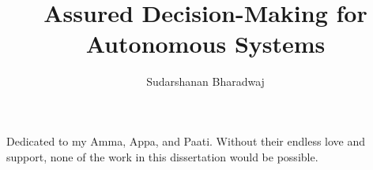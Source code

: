 \documentclass[12pt]{report}	%
\author{Sudarshanan Bharadwaj}  	%
\title{Assured Decision-Making for Autonomous Systems}
\theoremstyle{definition}
\theoremstyle{remark}
\begin{document}
\copyrightpage          %


%
%
%
\commcertpage           %

\titlepage              %



%
\begin{dedication}
%
Dedicated to my Amma, Appa, and Paati. Without their endless love and support, none of the work in this dissertation would be possible.
\end{dedication}
\end{document}
